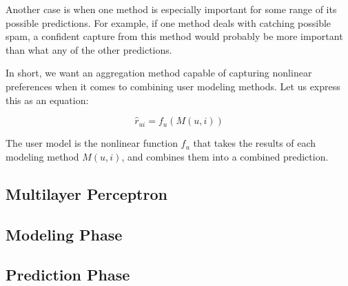 Another case is when one method is especially important for some 
range of its possible predictions. For example, if one method deals with catching possible spam,
a confident capture from this method would probably be more important than 
what any of the other predictions.

In short, we want an aggregation method capable of capturing nonlinear preferences
when it comes to combining user modeling methods.
Let us express this as an equation:

\begin{equation*}
  \hat{r}_{ui} = f_{u}(M(u,i))
\end{equation*}

The user model is the nonlinear function $f_u$ that takes the results of each modeling method $M(u,i)$,
and combines them into a combined prediction.




\subsection{Multilayer Perceptron}
\subsection{Modeling Phase}
\subsection{Prediction Phase}




